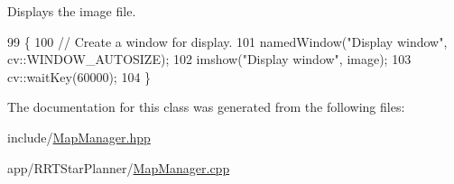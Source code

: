 Displays the image file. 


\begin{DoxyCode}
99                            \{
100   \textcolor{comment}{// Create a window for display.}
101   namedWindow(\textcolor{stringliteral}{"Display window"}, cv::WINDOW\_AUTOSIZE);
102   imshow(\textcolor{stringliteral}{"Display window"}, image);
103   cv::waitKey(60000);
104 \}
\end{DoxyCode}


The documentation for this class was generated from the following files\+:\begin{DoxyCompactItemize}
\item 
include/\hyperlink{MapManager_8hpp}{Map\+Manager.\+hpp}\item 
app/\+R\+R\+T\+Star\+Planner/\hyperlink{MapManager_8cpp}{Map\+Manager.\+cpp}\end{DoxyCompactItemize}
